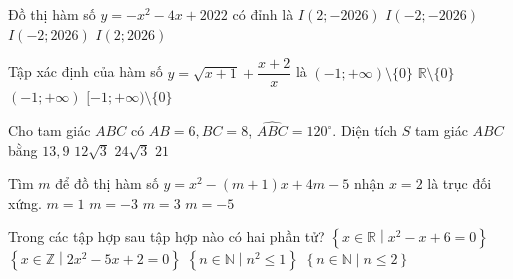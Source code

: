 \begin{ex}%
	Đồ thị hàm số $y=-x^2-4 x+2022$ có đỉnh là
	\choice
	{$I(2 ;-2026)$}
	{$I(-2 ;-2026)$}
	{\True $I(-2 ;2026)$}
	{$I(2 ;2026)$}
\end{ex}
\begin{ex}%
	Tập xác định của hàm số $y=\sqrt{x+1}+\dfrac{x+2}{x}$ là
	\choice
	{$(-1 ;+\infty)\setminus \{0\}$}
	{$\mathbb{R} \setminus\{0\}$}
	{$(-1 ;+\infty)$}
	{\True $[-1 ;+\infty) \setminus\{0\}$}
	\loigiai{
	Diều kiện $\heva{&x+1\ge 0\\&x\ne 0}\Leftrightarrow \heva{&x\ge -1\\&x\ne 0.}$\\	
	Vậy $\mathscr{D}=[-1 ;+\infty) \setminus\{0\}$.
	}
\end{ex}
\begin{ex}%
	Cho tam giác $A B C$ có $A B=6, B C=8$, $\widehat{A B C}=120^{\circ}$. Diện tích $S$ tam giác $A B C$ bằng
	\choice
	{$13{,}9$}
	{\True $12 \sqrt{3}$}
	{$24 \sqrt{3}$}
	{$21$}
\end{ex}
\begin{ex}%
	Tìm $m$ để đồ thị hàm số $y=x^2-(m+1) x+4 m-5$ nhận $x=2$ là trục đối xứng.
	\choice
	{$m=1$}
	{$m=-3$}
	{\True $m=3$}
	{$m=-5$}
\end{ex}
\begin{ex}%
	Trong các tập hợp sau tập hợp nào có hai phần tử? 
	\choice
	{$\left\{x \in \mathbb{R} \middle | x^2-x+6=0\right\}$}
	{$\left\{x \in \mathbb{Z} \middle | 2 x^2-5 x+2=0\right\}$}
	{\True $\left\{n \in \mathbb{N} \middle | n^2 \leq 1\right\}$}	
	{$\left\{n \in \mathbb{N} \middle | n \leq 2\right\}$}
\end{ex}

